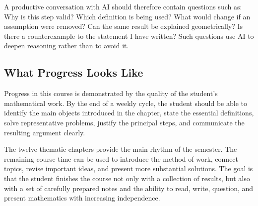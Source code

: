 A productive conversation with AI should therefore contain questions such as:
Why is this step valid? Which definition is being used? What would change if an
assumption were removed? Can the same result be explained geometrically? Is
there a counterexample to the statement I have written? Such questions use AI
to deepen reasoning rather than to avoid it.

\subsection{What Progress Looks Like}

Progress in this course is demonstrated by the quality of the student's
mathematical work. By the end of a weekly cycle, the student should be able to
identify the main objects introduced in the chapter, state the essential
definitions, solve representative problems, justify the principal steps, and
communicate the resulting argument clearly.

The twelve thematic chapters provide the main rhythm of the semester. The
remaining course time can be used to introduce the method of work, connect
topics, revise important ideas, and present more substantial solutions. The
goal is that the student finishes the course not only with a collection of
results, but also with a set of carefully prepared notes and the ability to
read, write, question, and present mathematics with increasing independence.
